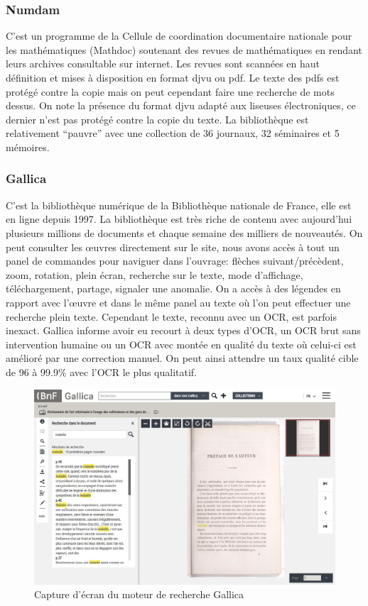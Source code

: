         \subsubsection{Numdam}
        \label{subsubsec:numdam}
        C’est un programme de la Cellule de coordination documentaire nationale pour les mathématiques (Mathdoc) soutenant des revues de mathématiques en rendant leurs archives consultable sur internet. Les revues sont scannées en haut définition et mises à disposition en format djvu ou pdf. Le texte des pdfs est protégé contre la copie mais on peut cependant faire une recherche de mots dessus. On note la présence du format djvu adapté aux liseuses électroniques, ce dernier n’est pas protégé contre la copie du texte. La bibliothèque est relativement “pauvre” avec une collection de 36 journaux, 32 séminaires et 5 mémoires.

        \subsubsection{Gallica}
        \label{subsubsec:gallica}
        C’est la bibliothèque numérique de la Bibliothèque nationale de France, elle est en ligne depuis 1997. La bibliothèque est très riche de contenu avec aujourd’hui plusieurs millions de documents et chaque semaine des milliers de nouveautés. On peut consulter les œuvres directement sur le site, nous avons accès à tout un panel de commandes pour naviguer dans l’ouvrage: flèches suivant/précèdent, zoom, rotation, plein écran, recherche sur le texte, mode d’affichage, téléchargement, partage, signaler une anomalie. On a accès à des légendes en rapport avec l’œuvre et dans le même panel au texte où l’on peut effectuer une recherche plein texte. Cependant le texte, reconnu avec un OCR, est parfois inexact. Gallica informe avoir eu recourt à deux types d’OCR, un OCR brut sans intervention humaine ou un OCR avec montée en qualité du texte où celui-ci est amélioré par une correction manuel. On peut ainsi attendre un taux qualité cible de 96 à 99.9\% avec l’OCR le plus qualitatif. 

        \begin{figure}[ht!]
            \centering
            \includegraphics[width=1\textwidth]{figure/screenshot_gallica.jpg}
            \caption{Capture d'écran du moteur de recherche Gallica}
            \label{fig:gallica}
        \end{figure}

